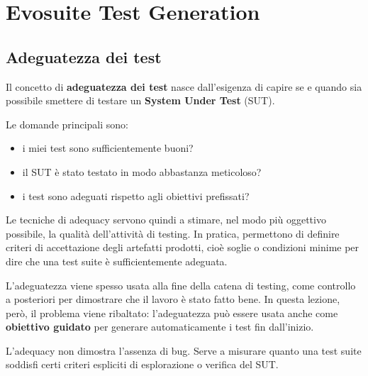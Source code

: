 \chapter{Evosuite Test Generation}

\section{Adeguatezza dei test}

Il concetto di \textbf{adeguatezza dei test} nasce dall'esigenza di capire se e quando sia possibile smettere di testare un \textbf{System Under Test} (SUT).

Le domande principali sono:

\begin{itemize}

\item i miei test sono sufficientemente buoni?

\item il SUT è stato testato in modo abbastanza meticoloso?

\item i test sono adeguati rispetto agli obiettivi prefissati?

\end{itemize}

Le tecniche di adequacy servono quindi a stimare, nel modo più oggettivo possibile, la qualità dell'attività di testing. In pratica, permettono di definire criteri di accettazione degli artefatti prodotti, cioè soglie o condizioni minime per dire che una test suite è sufficientemente adeguata.

\begin{notaprof}

L'adeguatezza viene spesso usata alla fine della catena di testing, come controllo a posteriori per dimostrare che il lavoro è stato fatto bene. In questa lezione, però, il problema viene ribaltato: l'adeguatezza può essere usata anche come \textbf{obiettivo guidato} per generare automaticamente i test fin dall'inizio.

\end{notaprof}

\begin{notaesame}

L'adequacy non dimostra l'assenza di bug. Serve a misurare quanto una test suite soddisfi certi criteri espliciti di esplorazione o verifica del SUT.

\end{notaesame}

